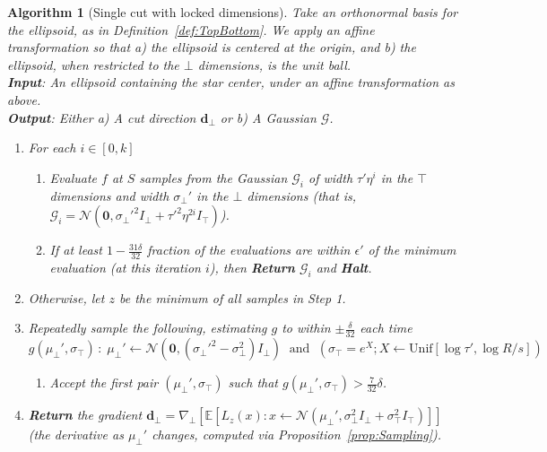 \documentclass[11pt,letter]{article}
\newcommand{\Exp}{\mathbb{E}}
\newcommand{\from}{\leftarrow}
\newcommand{\Normal}{\mathcal{N}}
\newcommand{\Unif}{\mathrm{Unif}}
\renewcommand{\vec}[1]{\mathbf{#1}}
\newcommand{\Grad}{\nabla}
\newcommand{\perr}{\delta}
\newcommand{\safety}{s}
\numberwithin{nTheorems}{section}
\newtheorem{myalgorithm}{Algorithm}
\begin{document}
\vspace{3mm}
\hspace*{-\parindent}\begin{minipage}{\linewidth}
\begin{framed}
\begin{myalgorithm}[Single cut with locked dimensions]
\label{alg:SingleCut}
Take an orthonormal basis for the ellipsoid, as in Definition~\ref{def:TopBottom}.
We apply an affine transformation so that a) the ellipsoid is centered at the origin, and b) the ellipsoid, when restricted to the $\bot$ dimensions, is the unit ball.\\

\noindent\textbf{Input}: An ellipsoid containing the star center, under an affine transformation as above.\\
\textbf{Output}: \emph{Either} a) A cut direction $\vec{d}_\bot$ \emph{or} b) A Gaussian $\mathcal{G}$.

 \begin{enumerate}
 \item For each $i\in [0, k]$
     \begin{enumerate}
     \item[1a.] Evaluate $f$ at $S$ samples from the Gaussian $\mathcal{G}_i$ of width $\tau'\eta^i$ in the $\top$ dimensions and width $\sigma_\bot'$ in the $\bot$ dimensions (that is, $\mathcal{G}_i=\Normal(\vec{0}, \sigma_\bot'^2 I_\bot + \tau'^2\eta^{2i} I_\top)$).
     \item[1b.] If at least $1 - \frac{31\perr}{32}$ fraction of the evaluations are within $\epsilon'$ of the minimum evaluation (at this iteration $i$), then {\bf Return} $\mathcal{G}_i$ and {\bf Halt}.
     \end{enumerate}
 \item Otherwise, let $z$ be the minimum of all samples in Step 1.
\item Repeatedly sample the following, estimating $g$ to within $\pm \frac{\perr}{32}$ each time\vspace{-1mm} $$g(\mu_\bot', \sigma_\top)\, :\; \mu_\bot'\from\Normal(\vec{0}, (\sigma_\bot'^2 - \sigma_\bot^2)I_\bot)\;\text{ and }\;(\sigma_\top = e^X; X \from \Unif[\log \tau', \log R/\safety])$$
\begin{enumerate}\item[3a.]
    Accept the first pair $(\mu_\bot', \sigma_\top)$ such that $g(\mu_\bot', \sigma_\top) > \frac{7}{32}\perr$.
    \end{enumerate}
 \item {\bf Return} the gradient $\vec{d}_\bot = \Grad_\bot[\Exp[L_z(x) : x \from \Normal(\mu_\bot', \sigma_\bot^2 I_\bot + \sigma_\top^2 I_\top)]]$ \quad(the derivative as $\mu_\bot'$ changes, computed via Proposition~\ref{prop:Sampling}).
\end{enumerate}




\end{myalgorithm}
\end{framed}
\end{minipage}\vspace{3mm}
\end{document}
